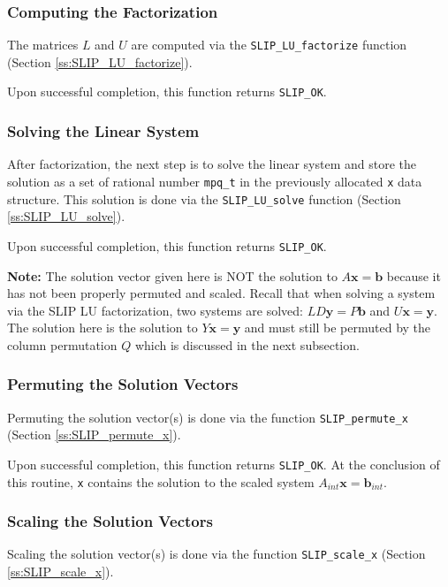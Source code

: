 \documentclass[11pt]{article}
\theoremstyle{definition}
\begin{document}
\subsubsection{Computing the Factorization}

The matrices $L$ and $U$ are computed via the \verb|SLIP_LU_factorize| function (Section \ref{ss:SLIP_LU_factorize}).

Upon successful completion, this function returns \verb|SLIP_OK|.

\subsubsection{Solving the Linear System}

After factorization, the next step is to solve the linear system and store the solution as a set of rational number \verb|mpq_t| in the previously allocated \verb|x| data structure. This solution is done via the \verb|SLIP_LU_solve| function (Section \ref{ss:SLIP_LU_solve}).

Upon successful completion, this function returns \verb|SLIP_OK|.

\textbf{Note:} The solution vector given here is NOT the solution to $A \mathbf{x} = \mathbf{b}$ because it has not been properly permuted and scaled. Recall that when solving a system via the SLIP LU factorization, two systems are solved: $LD \mathbf{y} = P \mathbf{b}$ and $U \mathbf{x} = \mathbf{y}$. The solution here is the solution to $Y \mathbf{x} = \mathbf{y}$ and must still be permuted by the column permutation $Q$ which is discussed in the next subsection.

\subsubsection{Permuting the Solution Vectors}

Permuting the solution vector(s) is done via the function \verb|SLIP_permute_x| (Section \ref{ss:SLIP_permute_x}).

Upon successful completion, this function returns \verb|SLIP_OK|. At the conclusion of this routine, \verb|x| contains the solution to the scaled system $A_{int} \mathbf{x} = \mathbf{b}_{int}$.

\subsubsection{Scaling the Solution Vectors}

Scaling the solution vector(s) is done via the function \verb|SLIP_scale_x| (Section \ref{ss:SLIP_scale_x}).
\end{document}
